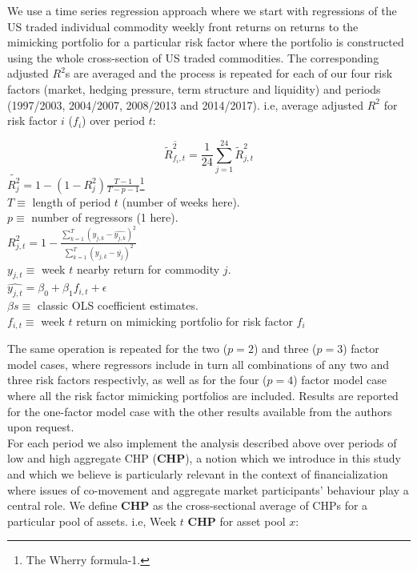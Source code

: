 \documentclass[12pt,]{article}
\let\rmarkdownfootnote\footnote%
\def\footnote{\protect\rmarkdownfootnote}
\begin{document}
We use a time series regression approach where we start with regressions
of the US traded individual commodity weekly front returns on returns to
the mimicking portfolio for a particular risk factor where the portfolio
is constructed using the whole cross-section of US traded commodities.
The corresponding adjusted \(R^{2}\)s are averaged and the process is
repeated for each of our four risk factors (market, hedging pressure,
term structure and liquidity) and periods (1997/2003, 2004/2007,
2008/2013 and 2014/2017). i.e, average adjusted \(R^{2}\) for risk
factor \(i\) (\(f_{i}\)) over period \(t\):

\[\overline{\tilde{R}_{f_{i},t}^{2}}=\frac{1}{24}\sum_{j=1}^{24}\tilde{R}_{j,t}^{2}\]
\(\tilde{R_{j}^{2}}=1-(1-R_{j}^{2})\frac{T-1}{T-p-1}\)\footnote{The
  Wherry formula-1.}\\
\(T\equiv\) length of period \(t\) (number of weeks here).\\
\(p\equiv\) number of regressors (1 here).\\
\(R_{j,t}^{2}=1-\frac{\sum_{k=1}^{T}(y_{j,k}-\hat{y_{j,k}})^{2}}{\sum_{k=1}^{T}(y_{j,k}-\overline{y_{j}})^{2}}\)\\
\(y_{j,t}\equiv\) week \(t\) nearby return for commodity \(j\).\\
\(\hat{y_{j,t}}=\beta_{0}+\beta_{1}f_{i,t}+\epsilon\)\\
\(\beta s \equiv\) classic OLS coefficient estimates.\\
\(f_{i,t}\equiv\) week \(t\) return on mimicking portfolio for risk
factor \(f_{i}\)

The same operation is repeated for the two (\(p=2\)) and three (\(p=3\))
factor model cases, where regressors include in turn all combinations of
any two and three risk factors respectivly, as well as for the four
(\(p=4\)) factor model case where all the risk factor mimicking
portfolios are included. Results are reported for the one-factor model
case with the other results available from the authors upon request.\\
For each period we also implement the analysis described above over
periods of low and high aggregate CHP (\textbf{CHP}), a notion which we
introduce in this study and which we believe is particularly relevant in
the context of financialization where issues of co-movement and
aggregate market participants' behaviour play a central role. We define
\textbf{CHP} as the cross-sectional average of CHPs for a particular
pool of assets. i.e, Week \(t\) \textbf{CHP} for asset pool \(x\):
\end{document}
